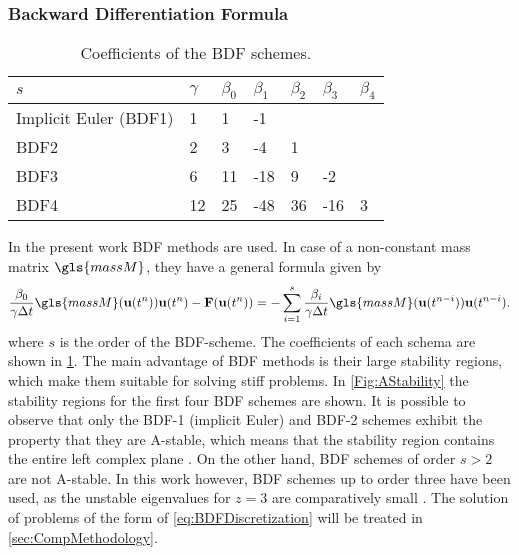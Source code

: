\subsubsection{Backward Differentiation Formula}
\begin{table}[b]
	\centering
	\begin{tabular}{lllllll}
		\hline
		$s$                   & $\gamma$ & $\beta_0$ & $\beta_1$ & $\beta_2$ & $\beta_3$ & $\beta_4$ \\ \hline
		Implicit Euler (BDF1) & 1        & 1         & -1        &           &           &           \\
		BDF2                  & 2        & 3         & -4        & 1         &           &           \\
		BDF3                  & 6        & 11        & -18       & 9         & -2        &           \\
		BDF4                  & 12       & 25        & -48       & 36        & -16       & 3         \\ \hline
	\end{tabular}
	\caption{Coefficients of the BDF schemes.}
	\label{tab:BDFCoeff}
\end{table}
In the present work BDF methods are used. In case of a non-constant mass matrix $\gls{massM}$, they have a general formula given by
\begin{equation}
	\frac{\beta_0}{\gamma\Delta t}\gls{massM}(\vec{u}(t^n))\vec{u}(t^n)- \vec{F}(\vec{u}(t^n)) = - \sum_{i=1}^s \frac{\beta_i}{\gamma \Delta t}\gls{massM}(\vec{u}(t^{n-i}))\vec{u}(t^{n-i}).
\end{equation}\label{eq:BDFDiscretization}
where $s$ is the order of the BDF-scheme.  The coefficients of each schema are shown in \cref{tab:BDFCoeff}. The main advantage of BDF methods is their large stability regions, which make them suitable for solving stiff problems.  In \cref{Fig:AStability} the stability regions for the first four BDF schemes are shown. It is possible to observe that only the BDF-1 (implicit Euler) and BDF-2 schemes exhibit the property that they are A-stable, which means that the stability region contains the entire left complex plane \parencite{dahlquistSpecialStabilityProblem1963}. On the other hand, BDF schemes of order $s > 2$ are not A-stable. In this work however, BDF schemes up to order three have been used, as the unstable eigenvalues for $z=3$ are comparatively small \parencite{smudamartinDirectNumericalSimulation2021}.
The solution of problems of the form of \cref{eq:BDFDiscretization} will be treated in \cref{sec:CompMethodology}.

